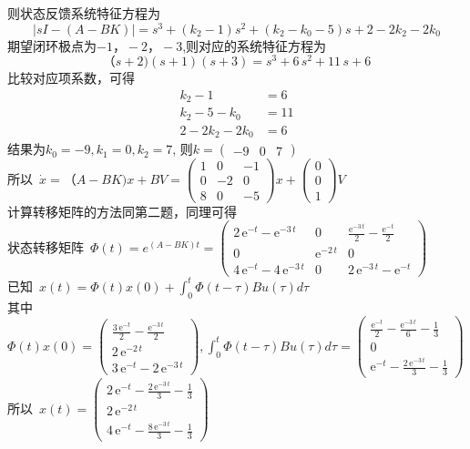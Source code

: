 \documentclass{article}
\begin{document}
则状态反馈系统特征方程为
$$ \left|sI-(A-BK)\right|= s^3+(k_2-1)s^2+(k_2-k_0-5)s+2-2k_2-2k_0$$ 
期望闭环极点为$-1，-2，-3$,则对应的系统特征方程为
$$ （s+2)(s+1)(s+3)=s^3 + 6\, s^2 + 11\, s + 6 $$ 
比较对应项系数，可得 
\begin{align*}
k_2-1 &= 6 \\
k_2-5-k_0 &=11 \\
2-2k_2-2k_0 &=6
\end{align*}
结果为$k_0=-9,k_1=0,k_2=7$, 则$ k=\left(\begin{array}{ccc} -9 & 0 & 7 \end{array}\right) $ \\
\mbox{所以 }$\dot{x}=（A-BK)x+BV=\left(\begin{array}{ccc} 1 & 0 & -1\\ 0 & -2 & 0\\ 8 & 0 & -5 \end{array}\right)x+\left(\begin{array}{c} 0\\ 0\\ 1 \end{array}\right)V$ \\
计算转移矩阵的方法同第二题，同理可得\\
\mbox{状态转移矩阵 }$ \Phi(t)=e^{(A-BK)t}=\left(\begin{array}{ccc} 2\, \mathrm{e}^{- t} - \mathrm{e}^{- 3\, t} & 0 & \frac{\mathrm{e}^{- 3\, t}}{2} - \frac{\mathrm{e}^{- t}}{2}\\ 0 & \mathrm{e}^{- 2\, t} & 0\\ 4\, \mathrm{e}^{- t} - 4\, \mathrm{e}^{- 3\, t} & 0 & 2\, \mathrm{e}^{- 3\, t} - \mathrm{e}^{- t} \end{array}\right) $\\
\mbox{已知 }$x(t)=\Phi(t)x(0)+\int_{0}^{t}\Phi(t-\tau)Bu(\tau)d\tau $ \\
\mbox{其中 }$\Phi(t)x(0)=\left(\begin{array}{c} \frac{3\, \mathrm{e}^{- t}}{2} - \frac{\mathrm{e}^{- 3\, t}}{2}\\ 2\, \mathrm{e}^{- 2\, t}\\ 3\, \mathrm{e}^{- t} - 2\, \mathrm{e}^{- 3\, t} \end{array}\right),
\int_{0}^{t}\Phi(t-\tau)Bu(\tau)d\tau=\left(\begin{array}{c} \frac{\mathrm{e}^{- t}}{2} - \frac{\mathrm{e}^{- 3\, t}}{6} - \frac{1}{3}\\ 0\\ \mathrm{e}^{- t} - \frac{2\, \mathrm{e}^{- 3\, t}}{3} - \frac{1}{3} \end{array}\right) $ \\
\mbox{所以 }$x(t)=\left(\begin{array}{c} 2\, \mathrm{e}^{- t} - \frac{2\, \mathrm{e}^{- 3\, t}}{3} - \frac{1}{3}\\ 2\, \mathrm{e}^{- 2\, t}\\ 4\, \mathrm{e}^{- t} - \frac{8\, \mathrm{e}^{- 3\, t}}{3} - \frac{1}{3} \end{array}\right)$ 
\end{document}
